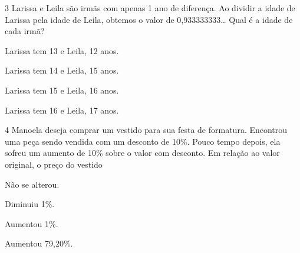 \num{3} Larissa e Leila são irmãs com apenas 1 ano de diferença. Ao dividir a
idade de Larissa pela idade de Leila, obtemos o valor de
0,933333333\ldots{} Qual é a idade de cada irmã?

\begin{escolha}
\item Larissa tem 13 e Leila, 12 anos.
\item Larissa tem 14 e Leila, 15 anos.
\item Larissa tem 15 e Leila, 16 anos.
\item Larissa tem 16 e Leila, 17 anos.
\end{escolha}






\num{4} Manoela deseja comprar um vestido para sua festa de formatura.
Encontrou uma peça sendo vendida com um desconto de 10\%. Pouco tempo
depois, ela sofreu um aumento de 10\% sobre o valor com desconto. Em
relação ao valor original, o preço do vestido

\begin{escolha}
\item Não se alterou.
\item Diminuiu 1\%.
\item Aumentou 1\%.
\item Aumentou 79,20\%.
\end{escolha}



